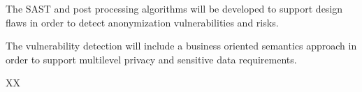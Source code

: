 \begin{Workpackage}{\thewpno}
\begin{Task}
The SAST and post processing algorithms will be developed to support design flaws in order to detect anonymization vulnerabilities and risks.

The vulnerability detection will include a business oriented semantics approach in order to support multilevel privacy and sensitive data requirements.

 \end{Task}


\begin{WPDeliverables}
  \begin{compactitem}
    \item XX
\end{compactitem}
\end{WPDeliverables}
\end{Workpackage}
